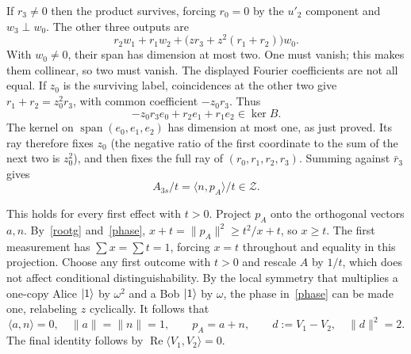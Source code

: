 \documentclass[11pt]{article}
\begin{document}
If $r_3\ne0$ then the product survives, forcing $r_0=0$ by the $u'_2$ component and $w_3\perp w_0$. The other three outputs are
\begin{equation}r_2w_1+r_1w_2+\bigl(z r_3+z^2(r_1+r_2)\bigr)w_0.\label{last}\end{equation}
With $w_0\ne0$, their span has dimension at most two. One must vanish; this makes them collinear, so two must vanish. The displayed Fourier coefficients are not all equal. If $z_0$ is the surviving label, coincidences at the other two give $r_1+r_2=z_0^2 r_3$, with common coefficient $-z_0 r_3$. Thus
\[
   -z_0 r_3 e_0+r_2 e_1+r_1 e_2\in\ker B.
\]
The kernel on $\operatorname{span}(e_0,e_1,e_2)$ has dimension at most one, as just proved. Its ray therefore fixes $z_0$ (the negative ratio of the first coordinate to the sum of the next two is $z_0^2$), and then fixes the full ray of $(r_0,r_1,r_2,r_3)$. Summing against $\bar r_3$ gives
\begin{equation} A_{3s}/t=\langle n,p_A\rangle/t\in\mathcal Z .\label{phase}\end{equation}

This holds for every first effect with $t>0$. Project $p_A$ onto the orthogonal vectors $a,n$. By~\eqref{rootg} and~\eqref{phase}, $x+t=\|p_A\|^2\ge t^2/x+t$, so $x\ge t$. The first measurement has $\sum x=\sum t=1$, forcing $x=t$ throughout and equality in this projection. Choose any first outcome with $t>0$ and rescale $A$ by $1/t$, which does not affect conditional distinguishability. By the local symmetry that multiplies a one-copy Alice $|1\rangle$ by $\omega^2$ and a Bob $|1\rangle$ by $\omega$, the phase in~\eqref{phase} can be made one, relabeling $z$ cyclically. It follows that
\begin{equation}
  \langle a,n\rangle=0,\quad \|a\|=\|n\|=1,\qquad
  p_A=a+n,\qquad d:=V_1-V_2,\quad \|d\|^2=2.\label{sat}
\end{equation}
The final identity follows by $\operatorname{Re}\langle V_1,V_2\rangle=0$.
\end{document}
